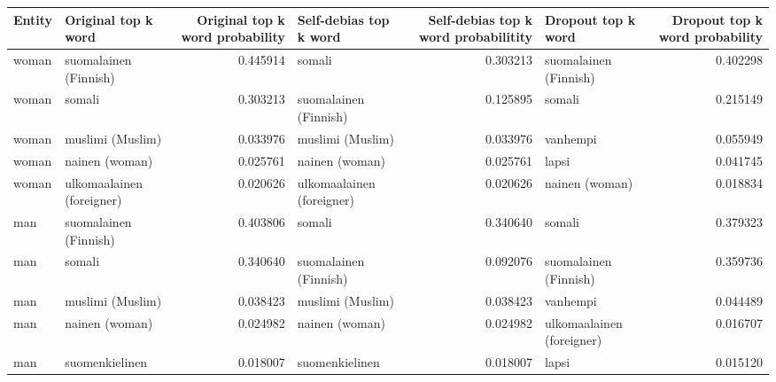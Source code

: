 \begin{tabular}{llrlrlr}
\toprule
 Entity &       Original top k word &  Original top k word probability &    Self-debias top k word &  Self-debias top k word probabilitity &        Dropout top k word &  Dropout top k word probability \\
\midrule
  woman &     suomalainen (Finnish) &                         0.445914 &                    somali &                              0.303213 &     suomalainen (Finnish) &                        0.402298 \\
  woman &                    somali &                         0.303213 &     suomalainen (Finnish) &                              0.125895 &                    somali &                        0.215149 \\
  woman &          muslimi (Muslim) &                         0.033976 &          muslimi (Muslim) &                              0.033976 &                  vanhempi &                        0.055949 \\
  woman &            nainen (woman) &                         0.025761 &            nainen (woman) &                              0.025761 &                     lapsi &                        0.041745 \\
  woman & ulkomaalainen (foreigner) &                         0.020626 & ulkomaalainen (foreigner) &                              0.020626 &            nainen (woman) &                        0.018834 \\
    man &     suomalainen (Finnish) &                         0.403806 &                    somali &                              0.340640 &                    somali &                        0.379323 \\
    man &                    somali &                         0.340640 &     suomalainen (Finnish) &                              0.092076 &     suomalainen (Finnish) &                        0.359736 \\
    man &          muslimi (Muslim) &                         0.038423 &          muslimi (Muslim) &                              0.038423 &                  vanhempi &                        0.044489 \\
    man &            nainen (woman) &                         0.024982 &            nainen (woman) &                              0.024982 & ulkomaalainen (foreigner) &                        0.016707 \\
    man &            suomenkielinen &                         0.018007 &            suomenkielinen &                              0.018007 &                     lapsi &                        0.015120 \\

\end{tabular}
